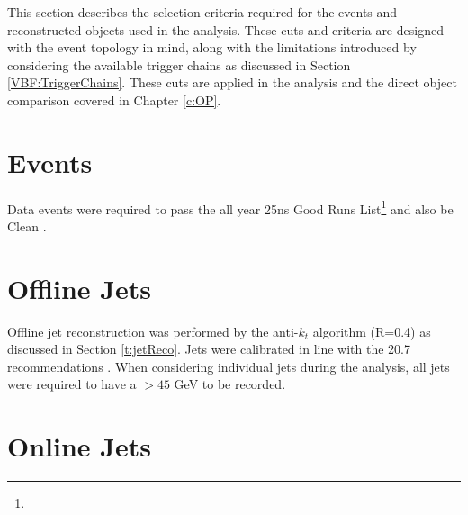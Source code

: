 This section describes the selection criteria required for the events and reconstructed objects used in the analysis. These cuts and criteria are designed with the \VBFHBB event topology in mind, along with the limitations introduced by considering the available trigger chains as discussed in Section \ref{VBF:TriggerChains}. These cuts are applied in the \VBFHBB analysis and the direct object comparison covered in Chapter \ref{c:OP}.

\section{Events}

Data events were required to pass the all year 25ns Good Runs List\footnote{}  and also be Clean . 

\section{Offline Jets}

	Offline jet reconstruction was performed by the anti-$k_t$ algorithm (R=0.4) as discussed in Section \ref{t:jetReco}. Jets were calibrated in line with the 20.7 recommendations . When considering individual jets during the analysis, all jets were required to have a \pt $> 45$ GeV to be recorded.
	
\section{Online Jets}
	
